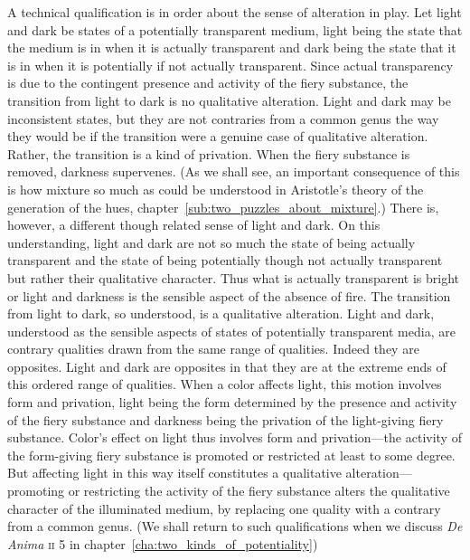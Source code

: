 A technical qualification is in order about the sense of alteration in play. Let light and dark be states of a potentially transparent medium, light being the state that the medium is in when it is actually transparent and dark being the state that it is in when it is potentially if not actually transparent. Since actual transparency is due to the contingent presence and activity of the fiery substance, the transition from light to dark is no qualitative alteration. Light and dark may be inconsistent states, but they are not contraries from a common genus the way they would be if the transition were a genuine case of qualitative alteration. Rather, the transition is a kind of privation. When the fiery substance is removed, darkness supervenes. (As we shall see, an important consequence of this is how mixture so much as could be understood in Aristotle's theory of the generation of the hues, chapter~\ref{sub:two_puzzles_about_mixture}.) There is, however, a different though related sense of light and dark. On this understanding, light and dark are not so much the state of being actually transparent and the state of being potentially though not actually transparent but rather their qualitative character. Thus what is actually transparent is bright or light and darkness is the sensible aspect of the absence of fire. The transition from light to dark, so understood, is a qualitative alteration. Light and dark, understood as the sensible aspects of states of potentially transparent media, are contrary qualities drawn from the same range of qualities. Indeed they are opposites. Light and dark are opposites in that they are at the extreme ends of this ordered range of qualities. When a color affects light, this motion involves form and privation, light being the form determined by the presence and activity of the fiery substance and darkness being the privation of the light-giving fiery substance. Color's effect on light thus involves form and privation---the activity of the form-giving fiery substance is promoted or restricted at least to some degree. But affecting light in this way itself constitutes a qualitative alteration---promoting or restricting the activity of the fiery substance alters the qualitative character of the illuminated medium, by replacing one quality with a contrary from a common genus. (We shall return to such qualifications when we discuss \emph{De Anima} \textsc{ii} 5 in chapter~\ref{cha:two_kinds_of_potentiality})

